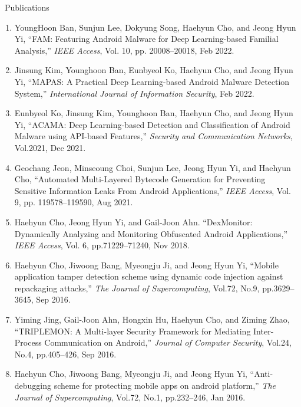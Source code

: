 \documentclass{resume} %
\begin{document}
\begin{rSection}{\faGenderless~Publications}
\begin{enumerate}[leftmargin=0pt]
		\item YoungHoon Ban, Sunjun Lee, Dokyung Song, {Haehyun Cho}, and Jeong Hyun Yi,
		``FAM: Featuring Android Malware for Deep Learning-based Familial Analysis,'' 
		\emph{IEEE Access}, 
		Vol. 10, pp. 20008--20018, Feb 2022.
		
		\item Jinsung Kim, Younghoon Ban, Eunbyeol Ko, {Haehyun Cho}, and Jeong Hyun Yi,
		``MAPAS: A Practical Deep Learning-based Android Malware Detection System,''
		\emph{International Journal of Information Security}, 
		Feb 2022.
		
		\item Eunbyeol Ko, Jinsung Kim, Younghoon Ban, {Haehyun Cho}, and Jeong Hyun Yi, 
		``ACAMA: Deep Learning-based Detection and Classification of Android Malware using API-based Features,''
		\emph{Security and Communication Networks}, 
		Vol.2021, Dec 2021.
		
		\item Geochang Jeon, Minseoung Choi, Sunjun Lee, Jeong Hyun Yi, and {Haehyun Cho},
		``Automated Multi-Layered Bytecode Generation for Preventing Sensitive Information Leaks From Android Applications,''
		\emph{IEEE Access}, 
		Vol. 9, pp. 119578--119590, Aug 2021.
		
		\item {Haehyun Cho}, Jeong Hyun Yi, and Gail-Joon Ahn.
        ``DexMonitor: Dynamically Analyzing and Monitoring Obfuscated Android Applications,'' 
        \emph{IEEE Access},
        Vol. 6, pp.71229--71240, Nov 2018.

		\item {Haehyun Cho}, Jiwoong Bang, Myeongju Ji, and Jeong Hyun Yi, 
		``Mobile application tamper detection scheme using dynamic code injection against repackaging attacks,'' 
		\emph{The Journal of Supercomputing}, 
		Vol.72, No.9, pp.3629--3645, Sep 2016.

		\item Yiming Jing, Gail-Joon Ahn, Hongxin Hu, {Haehyun Cho}, and Ziming Zhao,
		``TRIPLEMON: A Multi-layer Security Framework for Mediating Inter-Process Communication on Android,'' 
		\emph{Journal of Computer Security}, 
		Vol.24, No.4, pp.405--426, Sep 2016.

		\item {Haehyun Cho}, Jiwoong Bang, Myeongju Ji, and Jeong Hyun Yi, 
		``Anti-debugging scheme for protecting mobile apps on android platform,'' 
		\emph{The Journal of Supercomputing}, 
		Vol.72, No.1, pp.232--246, Jan 2016.


\end{enumerate}
\end{rSection}
\end{document}

